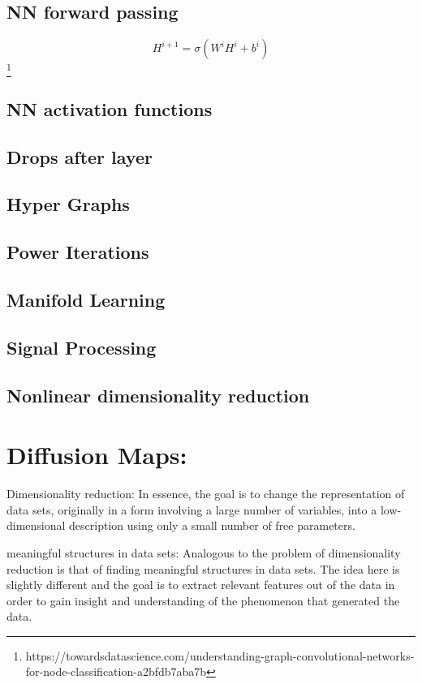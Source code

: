 \subsection{NN forward passing}
\begin{equation}
    H^{i + 1} = \sigma ( W^i H ^i + b^i)
\end{equation}
\footnote{https://towardsdatascience.com/understanding-graph-convolutional-networks-for-node-classification-a2bfdb7aba7b}

\subsection{NN activation functions}
\subsection{Drops after layer}

\subsection{Hyper Graphs}
\subsection{Power Iterations}
\subsection{Manifold Learning}
\subsection{Signal Processing}
\subsection{Nonlinear dimensionality reduction}


\section{Diffusion Maps:}
\citet{diffusionMaps}
\cite{diffusionMaps}

Dimensionality reduction:
In essence, the goal is to change the representation of data sets, originally in a form involving a large number of variables, into a
low-dimensional description using only a small number of free parameters.

meaningful structures in data sets:
Analogous to the problem of dimensionality reduction is that of finding meaningful structures in data sets. The idea here is slightly
different and the goal is to extract relevant features out of the data in order to gain insight and understanding of the
phenomenon that generated the data.

